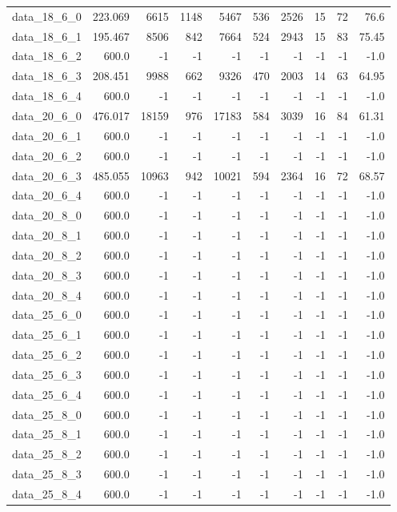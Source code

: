 \begin{tabular}{rrrrrrrrrr}
  data\_18\_6\_0 & 223.069 & 6615 & 1148 & 5467 & 536 & 2526 & 15 & 72 & 76.6 \\
  data\_18\_6\_1 & 195.467 & 8506 & 842 & 7664 & 524 & 2943 & 15 & 83 & 75.45 \\
  data\_18\_6\_2 & 600.0 & -1 & -1 & -1 & -1 & -1 & -1 & -1 & -1.0 \\
  data\_18\_6\_3 & 208.451 & 9988 & 662 & 9326 & 470 & 2003 & 14 & 63 & 64.95 \\
  data\_18\_6\_4 & 600.0 & -1 & -1 & -1 & -1 & -1 & -1 & -1 & -1.0 \\
  data\_20\_6\_0 & 476.017 & 18159 & 976 & 17183 & 584 & 3039 & 16 & 84 & 61.31 \\
  data\_20\_6\_1 & 600.0 & -1 & -1 & -1 & -1 & -1 & -1 & -1 & -1.0 \\
  data\_20\_6\_2 & 600.0 & -1 & -1 & -1 & -1 & -1 & -1 & -1 & -1.0 \\
  data\_20\_6\_3 & 485.055 & 10963 & 942 & 10021 & 594 & 2364 & 16 & 72 & 68.57 \\
  data\_20\_6\_4 & 600.0 & -1 & -1 & -1 & -1 & -1 & -1 & -1 & -1.0 \\
  data\_20\_8\_0 & 600.0 & -1 & -1 & -1 & -1 & -1 & -1 & -1 & -1.0 \\
  data\_20\_8\_1 & 600.0 & -1 & -1 & -1 & -1 & -1 & -1 & -1 & -1.0 \\
  data\_20\_8\_2 & 600.0 & -1 & -1 & -1 & -1 & -1 & -1 & -1 & -1.0 \\
  data\_20\_8\_3 & 600.0 & -1 & -1 & -1 & -1 & -1 & -1 & -1 & -1.0 \\
  data\_20\_8\_4 & 600.0 & -1 & -1 & -1 & -1 & -1 & -1 & -1 & -1.0 \\
  data\_25\_6\_0 & 600.0 & -1 & -1 & -1 & -1 & -1 & -1 & -1 & -1.0 \\
  data\_25\_6\_1 & 600.0 & -1 & -1 & -1 & -1 & -1 & -1 & -1 & -1.0 \\
  data\_25\_6\_2 & 600.0 & -1 & -1 & -1 & -1 & -1 & -1 & -1 & -1.0 \\
  data\_25\_6\_3 & 600.0 & -1 & -1 & -1 & -1 & -1 & -1 & -1 & -1.0 \\
  data\_25\_6\_4 & 600.0 & -1 & -1 & -1 & -1 & -1 & -1 & -1 & -1.0 \\
  data\_25\_8\_0 & 600.0 & -1 & -1 & -1 & -1 & -1 & -1 & -1 & -1.0 \\
  data\_25\_8\_1 & 600.0 & -1 & -1 & -1 & -1 & -1 & -1 & -1 & -1.0 \\
  data\_25\_8\_2 & 600.0 & -1 & -1 & -1 & -1 & -1 & -1 & -1 & -1.0 \\
  data\_25\_8\_3 & 600.0 & -1 & -1 & -1 & -1 & -1 & -1 & -1 & -1.0 \\
  data\_25\_8\_4 & 600.0 & -1 & -1 & -1 & -1 & -1 & -1 & -1 & -1.0 \\\hline
\end{tabular}
